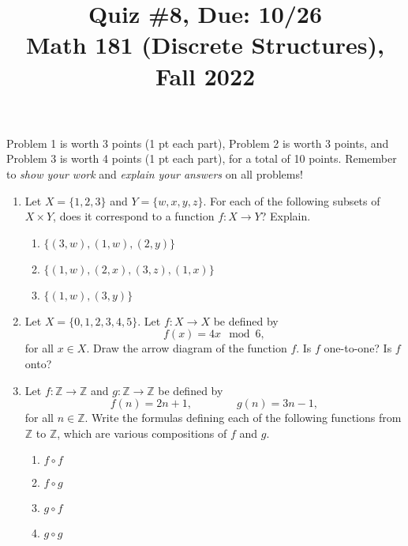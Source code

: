 \documentclass[11pt]{article}
\title{Quiz \#8, Due: 10/26 \\Math 181 (Discrete Structures), Fall 2022}
\date{}
\begin{document}
\maketitle

\thispagestyle{empty}

\vspace{-1cm}

Problem 1 is worth 3 points (1 pt each part), Problem 2 is worth 3 points, and Problem 3 is worth 4 points (1 pt each part), for a total of 10 points. Remember to \emph{show your work} and \emph{explain your answers} on all problems!

\begin{enumerate}

\item Let $X=\{1,2,3\}$ and $Y=\{w,x,y,z\}$. For each of the following subsets of $X \times Y$, does it correspond to a function $f \colon X \to Y$? Explain.
\begin{enumerate}
\item $\{(3,w),(1,w),(2,y)\}$
\item $\{(1,w),(2,x),(3,z),(1,x)\}$
\item $\{(1,w),(3,y)\}$
\end{enumerate}

\item Let $X = \{0,1,2,3,4,5\}$. Let $f\colon X \to X$ be defined by 
\[f(x) = 4x \mod 6,\] 
for all $x \in X$. Draw the arrow diagram of the function $f$. Is $f$ one-to-one? Is $f$ onto?

\item Let $f\colon \mathbb{Z} \to \mathbb{Z}$ and $g\colon\mathbb{Z}\to \mathbb{Z}$ be defined by
\[ f(n) = 2n+1, \qquad \qquad g(n) = 3n-1,\]
for all $n \in \mathbb{Z}$. Write the formulas defining each of the following functions from $\mathbb{Z}$ to $\mathbb{Z}$, which are various compositions of $f$ and $g$.
\begin{enumerate}
\item $f \circ f$
\item $f \circ g$
\item $g \circ f$
\item $g \circ g$
\end{enumerate}

\end{enumerate}
\end{document}
